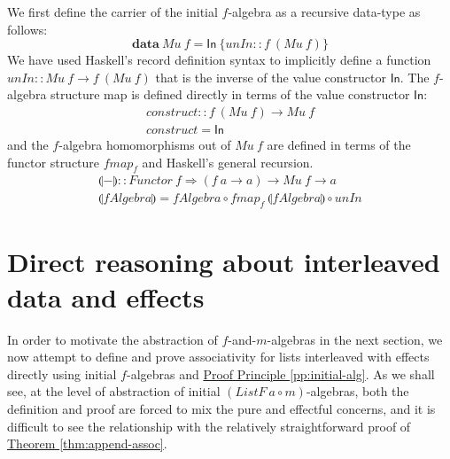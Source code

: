 \documentclass{jfp1}
\newcommand{\fold}[1]{\llparenthesis #1 \rrparenthesis}
\newcommand{\proofprinref}[1]{\hyperref[#1]{Proof Principle \ref*{#1}}}
\newcommand{\thmref}[1]{\hyperref[#1]{Theorem \ref*{#1}}}
\newcommand{\kw}[1]{\textbf{#1}}
\begin{document}
We first define the carrier of the initial $f$-algebra as a recursive
data-type as follows:
\begin{displaymath}
  \kw{data}~\mathit{Mu}~f = \mathsf{In}~\{ \mathit{unIn} :: f~(\mathit{Mu}~f) \}
\end{displaymath}
We have used Haskell's record definition syntax to implicitly define a
function $\mathit{unIn} :: \mathit{Mu}~f \to f~(\mathit{Mu}~f)$ that
is the inverse of the value constructor $\mathsf{In}$.  The
$f$-algebra structure map is defined directly in terms of the value
constructor $\mathsf{In}$:
\begin{displaymath}
  \begin{array}{l}
    \mathit{construct} :: f~(\mathit{Mu}~f) \to \mathit{Mu}~f \\
    \mathit{construct} = \mathsf{In}
  \end{array}
\end{displaymath}
and the $f$-algebra homomorphisms out of $\mathit{Mu}~f$ are defined
in terms of the functor structure $\mathit{fmap}_f$ and Haskell's
general recursion.
\begin{displaymath}
  \begin{array}{l}
    \fold{-} :: \mathit{Functor}~f \Rightarrow (f~a \to a) \to \mathit{Mu}~f \to a \\
    \fold{\mathit{fAlgebra}} = \mathit{fAlgebra} \circ \mathit{fmap}_f~\fold{\mathit{fAlgebra}} \circ \mathit{unIn}
  \end{array}
\end{displaymath}

\section{Direct reasoning about interleaved data and effects}
\label{sec:direct-eappend}

In order to motivate the abstraction of $f$-and-$m$-algebras in the
next section, we now attempt to define and prove associativity for
lists interleaved with effects directly using initial $f$-algebras and
\proofprinref{pp:initial-alg}. As we shall see, at the level of
abstraction of initial $(\mathit{ListF}~a \circ m)$-algebras, both the
definition and proof are forced to mix the pure and effectful
concerns, and it is difficult to see the relationship with the
relatively straightforward proof of \thmref{thm:append-assoc}.
\end{document}
